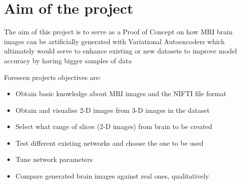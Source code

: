 \section{Aim of the project}

The aim of this project is to serve as a Proof of Concept on how MRI brain images can be artificially generated with Variational Autoencoders which ultimately would serve to enhance existing or new datasets to improve model accuracy by having bigger samples of data

Foreseen projects objectives are:

\begin{itemize}
    \item Obtain basic knowledge about MRI images and the NIFTI file format
    \item Obtain and visualise 2-D images from 3-D images in the dataset
    \item Select what range of slices (2-D images) from brain to be created
    \item Test different existing networks and choose the one to be used
    \item Tune network parameters
    \item Compare generated brain images against real ones, qualitatively
\end{itemize}